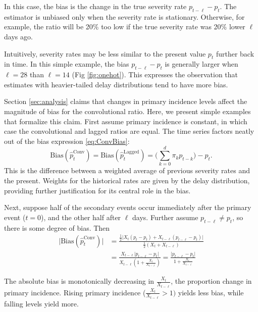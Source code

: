 \documentclass{article}
\begin{document}
In this case, the bias is the change in the true severity rate $p_{t-\ell} - p_t$. The estimator is unbiased only when the severity rate is stationary. Otherwise, for example, the ratio will be 20\% too low if the true severity rate was 20\% lower $\ell$ days ago. 

Intuitively, severity rates may be less similar to the present value $p_t$ further back in time. In this simple example, the bias $p_{t-\ell}-p_t$ is generally larger when $\ell=28$ than $\ell=14$ (Fig \ref{fig:onehot}). This expresses the observation that estimates with heavier-tailed delay distributions tend to have more bias. 


Section \ref{sec:analysis} claims that changes in primary incidence levels affect the magnitude of bias for the convolutional ratio. Here, we present simple examples that formalize this claim. First assume primary incidence is constant, in which case the convolutional and lagged ratios are equal. The time series factors neatly out of the bias expression  \ref{eq:ConvBias}:
$$\text{Bias}(\hat{p}_t^{\text{Conv}}) = \text{Bias}(\hat{p}_t^{\text{Lagged}}) = \Big(\sum_{k=0}^d \pi_k p_{t-k}\Big)-p_t.$$
\noindent This is the difference between a weighted average of previous severity rates and the present. Weights for the historical rates are given by the delay distribution, providing further justification for its central role in the bias. 

Next, suppose half of the secondary events occur immediately after the primary event ($t=0$), and the other half after $\ell$ days. Further assume $p_{t-\ell}\neq p_t$, so there is some degree of bias. Then
\begin{align*}
    \lvert\text{Bias}(\hat{p}_t^{\text{Conv}})\rvert &= \frac{\frac{1}{2}\big\lvert X_{t}(p_t-p_t) + X_{t-\ell}(p_{t-\ell}-p_t)\big\rvert}{\frac{1}{2}(X_{t}+X_{t-\ell})} \\
    &=\frac{X_{t-\ell}\lvert p_{t-\ell}-p_t\rvert}{X_{t-\ell}(1+\frac{X_{t}}{X_{t-\ell}})} = \frac{\lvert p_{t-\ell}-p_t \rvert}{1+\frac{X_{t}}{X_{t-\ell}}}
\end{align*}

The absolute bias is monotonically decreasing in $\frac{X_{t}}{X_{t-\ell}}$, the proportion change in primary incidence. Rising primary incidence ($\frac{X_{t}}{X_{t-\ell}}>1)$ yields less bias, while falling levels yield more.
\end{document}
